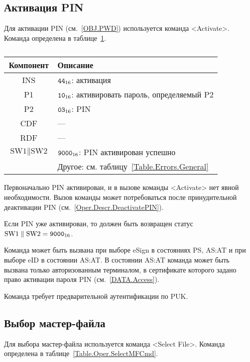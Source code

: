 \subsection{Активация PIN}\label{Oper.Descr.ActivatePIN}

Для активации PIN (см.~\ref{OBJ.PWD})  используется команда <Activate>.
Команда определена в таблице~\ref{Table.Oper.ActivatePINCmd}.

\begin{table}[hbt]
\caption{}\label{Table.Oper.ActivatePINCmd}
\begin{tabular}{|c|p{14cm}|}
\hline
Компонент & Описание\\
\hline
\hline
INS & $\texttt{44}_{16}$: активация\\
\hline
P1 & $\texttt{10}_{16}$: активировать пароль, определяемый P2\\
\hline
P2 & $\texttt{03}_{16}$: PIN \\
\hline
CDF &  ---  \\
\hline
\hline 
RDF &  --- \\
\hline
$\text{SW1} \parallel \text{SW2}$ & 
  $\texttt{9000}_{16}$:  PIN активирован успешно\\
\cline{2-2}
  & Другое: см. таблицу~\ref{Table.Errors.General}\\
\hline
\end{tabular}
\end{table}

Первоначально PIN активирован, и в вызове команды <Activate> 
нет явной необходимости. Вызов команды может потребоваться после 
принудительной деактивации PIN (см.~\ref{Oper.Descr.DeactivatePIN}). 

Если PIN уже активирован, то должен быть возвращен 
статус $\text{SW1} \parallel \text{SW2} = \texttt{9000}_{16}$.

Команда может быть вызвана при выборе eSign 
в состояниях PS, AS:AT и при выборе eID в состоянии 
AS:AT. В состоянии AS:AT команда может быть вызвана 
только авторизованным терминалом, в сертификате которого задано 
право активации пароля PIN (см.~\ref{DATA.Access}).

Команда требует предварительной аутентификации по PUK.

\subsection{Выбор мастер-файла}
\label{Oper.Descr.SelectMF}

Для выбора мастер-файла используется команда <Select File>. Команда определена в  
таблице~\ref{Table.Oper.SelectMFCmd}. 

